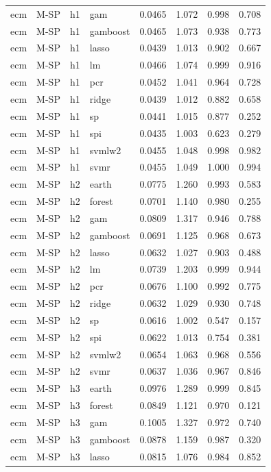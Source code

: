 \begin{ThreePartTable}
\begin{longtable}[t]{llclcccc}
ecm & M-SP & h1 & gam & 0.0465 & 1.072 & 0.998 & 0.708\\
ecm & M-SP & h1 & gamboost & 0.0465 & 1.073 & 0.938 & 0.773\\
ecm & M-SP & h1 & lasso & 0.0439 & 1.013 & 0.902 & 0.667\\
ecm & M-SP & h1 & lm & 0.0466 & 1.074 & 0.999 & 0.916\\
ecm & M-SP & h1 & pcr & 0.0452 & 1.041 & 0.964 & 0.728\\
ecm & M-SP & h1 & ridge & 0.0439 & 1.012 & 0.882 & 0.658\\
ecm & M-SP & h1 & sp & 0.0441 & 1.015 & 0.877 & 0.252\\
ecm & M-SP & h1 & spi & 0.0435 & 1.003 & 0.623 & 0.279\\
ecm & M-SP & h1 & svmlw2 & 0.0455 & 1.048 & 0.998 & 0.982\\
ecm & M-SP & h1 & svmr & 0.0455 & 1.049 & 1.000 & 0.994\\
\addlinespace
ecm & M-SP & h2 & earth & 0.0775 & 1.260 & 0.993 & 0.583\\
ecm & M-SP & h2 & forest & 0.0701 & 1.140 & 0.980 & 0.255\\
ecm & M-SP & h2 & gam & 0.0809 & 1.317 & 0.946 & 0.788\\
ecm & M-SP & h2 & gamboost & 0.0691 & 1.125 & 0.968 & 0.673\\
ecm & M-SP & h2 & lasso & 0.0632 & 1.027 & 0.903 & 0.488\\
ecm & M-SP & h2 & lm & 0.0739 & 1.203 & 0.999 & 0.944\\
ecm & M-SP & h2 & pcr & 0.0676 & 1.100 & 0.992 & 0.775\\
ecm & M-SP & h2 & ridge & 0.0632 & 1.029 & 0.930 & 0.748\\
ecm & M-SP & h2 & sp & 0.0616 & 1.002 & 0.547 & 0.157\\
ecm & M-SP & h2 & spi & 0.0622 & 1.013 & 0.754 & 0.381\\
ecm & M-SP & h2 & svmlw2 & 0.0654 & 1.063 & 0.968 & 0.556\\
ecm & M-SP & h2 & svmr & 0.0637 & 1.036 & 0.967 & 0.846\\
\addlinespace
ecm & M-SP & h3 & earth & 0.0976 & 1.289 & 0.999 & 0.845\\
ecm & M-SP & h3 & forest & 0.0849 & 1.121 & 0.970 & 0.121\\
ecm & M-SP & h3 & gam & 0.1005 & 1.327 & 0.972 & 0.740\\
ecm & M-SP & h3 & gamboost & 0.0878 & 1.159 & 0.987 & 0.320\\
ecm & M-SP & h3 & lasso & 0.0815 & 1.076 & 0.984 & 0.852\\

\end{longtable}
\end{ThreePartTable}
